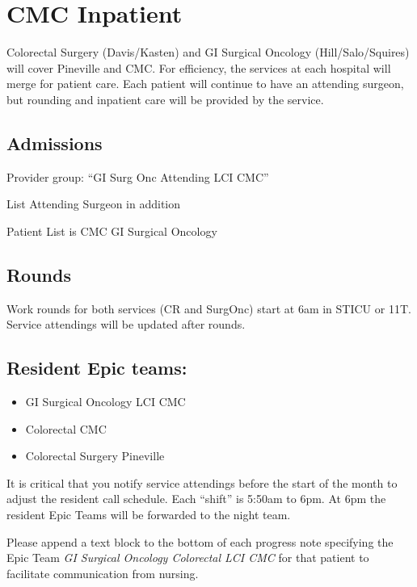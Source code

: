 \documentclass[
]{book}
\providecommand{\tightlist}{%
  \setlength{\itemsep}{0pt}\setlength{\parskip}{0pt}}
\begin{document}
\hypertarget{cmc-inpatient}{%
\chapter{CMC Inpatient}\label{cmc-inpatient}}

Colorectal Surgery (Davis/Kasten) and GI Surgical Oncology (Hill/Salo/Squires) will cover Pineville and CMC. For efficiency, the services at each hospital will merge for patient care. Each patient will continue to have an attending surgeon, but rounding and inpatient care will be provided by the service.

\hypertarget{admissions}{%
\section{Admissions}\label{admissions}}

Provider group: ``GI Surg Onc Attending LCI CMC''

List Attending Surgeon in addition

Patient List is CMC GI Surgical Oncology

\hypertarget{rounds}{%
\section{Rounds}\label{rounds}}

Work rounds for both services (CR and SurgOnc) start at 6am in STICU or 11T. Service attendings will be updated after rounds.

\hypertarget{resident-epic-teams}{%
\section{Resident Epic teams:}\label{resident-epic-teams}}

\begin{itemize}
\tightlist
\item
  GI Surgical Oncology LCI CMC
\item
  Colorectal CMC
\item
  Colorectal Surgery Pineville
\end{itemize}

It is critical that you notify service attendings before the start of the month to adjust the resident call schedule. Each ``shift'' is 5:50am to 6pm. At 6pm the resident Epic Teams will be forwarded to the night team.

Please append a text block to the bottom of each progress note specifying the Epic Team \emph{GI Surgical Oncology Colorectal LCI CMC} for that patient to facilitate communication from nursing.
\end{document}
